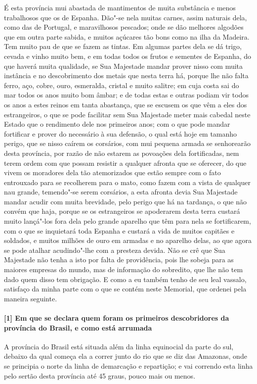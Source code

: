 \begin{linenumbers}
É esta província mui abastada de mantimentos de muita substância e menos trabalhosos que
os de Espanha. Dão"-se nela muitas carnes, assim naturais dela, como das de Portugal, e
maravilhosos pescados; onde se dão melhores algodões que em outra parte sabida, e muitos
açúcares tão bons como na ilha da Madeira. Tem muito pau de que se fazem as tintas. Em
algumas partes dela se dá trigo, cevada e vinho muito bem, e em todas todos os frutos e
sementes de Espanha, do que haverá muita qualidade, se Sua Majestade mandar prover nisso
com muita instância e no descobrimento dos metais que nesta terra há, porque lhe não falta
ferro, aço, cobre, ouro, esmeralda, cristal e muito salitre; em cuja costa sai do mar
todos os anos muito bom âmbar; e de todas estas e outras podiam vir todos os anos a estes
reinos em tanta abastança, que se escusem os que vêm a eles dos estrangeiros, o que se
pode facilitar sem Sua Majestade meter mais cabedal neste Estado que o rendimento dele nos
primeiros anos; com o que pode mandar fortificar e prover do necessário à sua defensão, o
qual está hoje em tamanho perigo, que se nisso caírem os corsários, com mui pequena armada
se senhorearão desta província, por razão de não estarem as povoações dela fortificadas,
nem terem ordem com que possam resistir a qualquer afronta que se oferecer, do que vivem
os moradores dela tão atemorizados que estão sempre com o fato entrouxado para se
recolherem para o mato, como fazem com a vista de qualquer nau grande, temendo"-se serem
corsários, a esta afronta devia Sua Majestade mandar acudir com muita brevidade, pelo
perigo que há na tardança, o que não convém que haja, porque se os estrangeiros se
apoderarem desta terra custará muito lançá"-los fora dela pelo grande aparelho que têm para
nela se fortificarem, com o que se inquietará toda Espanha e custará a vida de muitos
capitães e soldados, e muitos milhões de ouro em armadas e no aparelho delas, ao que agora
se pode atalhar acudindo"-lhe com a presteza devida. Não se crê que Sua Majestade não tenha
a isto por falta de providência, pois lhe sobeja para as maiores empresas do mundo, mas de
informação do sobredito, que lhe não tem dado quem disso tem obrigação. E como a eu também
tenho de seu leal vassalo, satisfaço da minha parte com o que se contém neste Memorial,
que ordenei pela maneira seguinte.

\paragraph{[1] Em que se declara quem foram os primeiros descobridores da província do
Brasil, e como está arrumada} \quad
A província do Brasil está situada além da linha equinocial da parte do sul, debaixo da
qual começa ela a correr junto do rio que se diz das Amazonas, onde se principia o norte
da linha de demarcação e repartição; e vai correndo esta linha pelo sertão desta província
até 45 graus, pouco mais ou menos.


\end{linenumbers}

